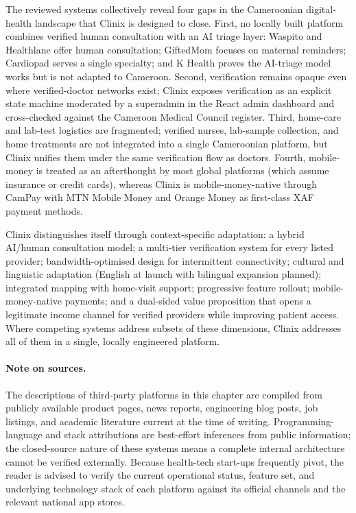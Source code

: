 The reviewed systems collectively reveal four gaps in the Cameroonian digital-health landscape that Clinix is designed to close. First, no locally built platform combines verified human consultation with an AI triage layer: Waspito and Healthlane offer human consultation; GiftedMom focuses on maternal reminders; Cardiopad serves a single specialty; and K Health proves the AI-triage model works but is not adapted to Cameroon. Second, verification remains opaque even where verified-doctor networks exist; Clinix exposes verification as an explicit state machine moderated by a superadmin in the React admin dashboard and cross-checked against the Cameroon Medical Council register. Third, home-care and lab-test logistics are fragmented; verified nurses, lab-sample collection, and home treatments are not integrated into a single Cameroonian platform, but Clinix unifies them under the same verification flow as doctors. Fourth, mobile-money is treated as an afterthought by most global platforms (which assume insurance or credit cards), whereas Clinix is mobile-money-native through CamPay with MTN Mobile Money and Orange Money as first-class XAF payment methods.

Clinix distinguishes itself through context-specific adaptation: a hybrid AI/human consultation model; a multi-tier verification system for every listed provider; bandwidth-optimised design for intermittent connectivity; cultural and linguistic adaptation (English at launch with bilingual expansion planned); integrated mapping with home-visit support; progressive feature rollout; mobile-money-native payments; and a dual-sided value proposition that opens a legitimate income channel for verified providers while improving patient access. Where competing systems address subsets of these dimensions, Clinix addresses all of them in a single, locally engineered platform.

\paragraph{Note on sources.}
The descriptions of third-party platforms in this chapter are compiled from publicly available product pages, news reports, engineering blog posts, job listings, and academic literature current at the time of writing. Programming-language and stack attributions are best-effort inferences from public information; the closed-source nature of these systems means a complete internal architecture cannot be verified externally. Because health-tech start-ups frequently pivot, the reader is advised to verify the current operational status, feature set, and underlying technology stack of each platform against its official channels and the relevant national app stores.
